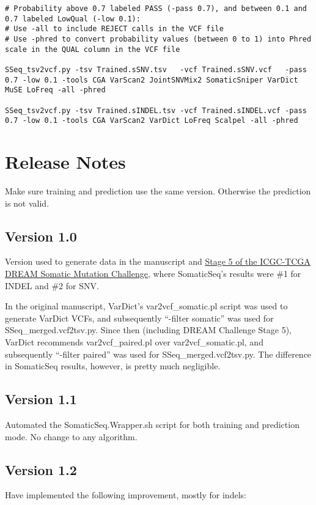 \documentclass[10pt,letterpaper]{article}
\begin{document}
\begin{sloppypar}
\begin{lstlisting}
# Probability above 0.7 labeled PASS (-pass 0.7), and between 0.1 and 0.7 labeled LowQual (-low 0.1):
# Use -all to include REJECT calls in the VCF file
# Use -phred to convert probability values (between 0 to 1) into Phred scale in the QUAL column in the VCF file

SSeq_tsv2vcf.py -tsv Trained.sSNV.tsv   -vcf Trained.sSNV.vcf   -pass 0.7 -low 0.1 -tools CGA VarScan2 JointSNVMix2 SomaticSniper VarDict MuSE LoFreq -all -phred

SSeq_tsv2vcf.py -tsv Trained.sINDEL.tsv -vcf Trained.sINDEL.vcf -pass 0.7 -low 0.1 -tools CGA VarScan2 VarDict LoFreq Scalpel -all -phred
\end{lstlisting}







\section{Release Notes}

Make sure training and prediction use the same version. Otherwise the prediction is not valid. 


\subsection{Version 1.0}
Version used to generate data in the manuscript and \href{https://www.synapse.org/#!Synapse:syn312572/wiki/72943}{Stage 5 of the ICGC-TCGA DREAM Somatic Mutation Challenge}, where SomaticSeq's results were \#1 for INDEL and \#2 for SNV. 

In the original manuscript, VarDict's var2vcf\_somatic.pl script was used to generate VarDict VCFs, and subsequently ``-filter somatic'' was used for SSeq\_merged.vcf2tsv.py. Since then (including DREAM Challenge Stage 5), VarDict recommends var2vcf\_paired.pl over var2vcf\_somatic.pl, and subsequently ``-filter paired'' was used for SSeq\_merged.vcf2tsv.py. The difference in SomaticSeq results, however, is pretty much negligible. 

\subsection{Version 1.1}
Automated the SomaticSeq.Wrapper.sh script for both training and prediction mode. No change to any algorithm. 

\subsection{Version 1.2}
Have implemented the following improvement, mostly for indels:


\end{sloppypar}
\end{document}
